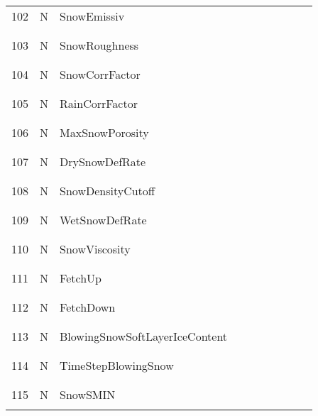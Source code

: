 \begin{longtable}{|c|c|l|c|c|c|c|p{}|c|p{}|}
102 & N & SnowEmissiv & & & & & & & \\
&&&&&&&&&\\\hline%
&&&&&&&&&\\
103 & N & SnowRoughness & & & & & & & \\
&&&&&&&&&\\\hline%
&&&&&&&&&\\
104 & N & SnowCorrFactor & & & & & & & \\
&&&&&&&&&\\\hline%
&&&&&&&&&\\
105 & N & RainCorrFactor & & & & & & & \\
&&&&&&&&&\\\hline%
&&&&&&&&&\\
106 & N & MaxSnowPorosity & & & & & & & \\
&&&&&&&&&\\\hline%
&&&&&&&&&\\
107 & N & DrySnowDefRate & & & & & & & \\
&&&&&&&&&\\\hline%
&&&&&&&&&\\
108 & N & SnowDensityCutoff & & & & & & & \\
&&&&&&&&&\\\hline%
&&&&&&&&&\\
109 & N & WetSnowDefRate & & & & & & & \\
&&&&&&&&&\\\hline%
&&&&&&&&&\\
110 & N & SnowViscosity & & & & & & & \\
&&&&&&&&&\\\hline%
&&&&&&&&&\\
111 & N & FetchUp & & & & & & & \\
&&&&&&&&&\\\hline%
&&&&&&&&&\\
112 & N & FetchDown & & & & & & & \\
&&&&&&&&&\\\hline%
&&&&&&&&&\\
113 & N & BlowingSnowSoftLayerIceContent & & & & & & & \\
&&&&&&&&&\\\hline%
&&&&&&&&&\\
114 & N & TimeStepBlowingSnow & & & & & & & \\
&&&&&&&&&\\\hline%
&&&&&&&&&\\
115 & N & SnowSMIN & & & & & & & \\
&&&&&&&&&\\\hline%

\end{longtable}
